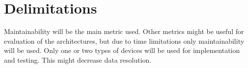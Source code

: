 \section{Delimitations}
\label{sec:delimitations}

Maintainability will be the main metric used. Other metrics might be useful for
evaluation of the architectures, but due to time limitations only
maintainability will be used. Only one or two types of devices will be used for
implementation and testing. This might decrease data resolution.
